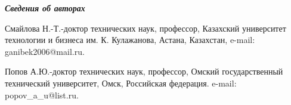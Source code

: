\emph{{\bfseries Сведения об авторах}}

\begin{noparindent}
Смайлова Н.-Т.-доктор технических наук, профессор, Казахский университет
технологии и бизнеса им. К. Кулажанова, Астана, Казахстан, e-mail:
ganibek2006@mail.ru.

Попов А.Ю.-доктор технических наук, профессор, Омский государственный
технический университет, Омск, Российская федерация. e-mail:
popov\_a\_u@list.ru.
\end{noparindent}


